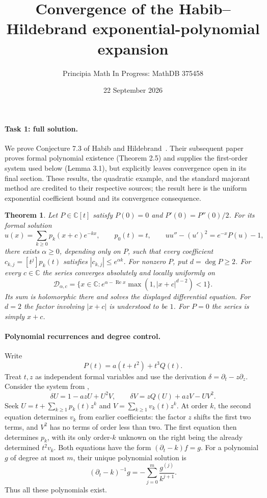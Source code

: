 \documentclass[11pt]{article}
\title{Convergence of the Habib--Hildebrand exponential-polynomial expansion}
\author{Principia Math In Progress: MathDB 375458}
\date{22 September 2026}
\newtheorem{theorem}{Theorem}
\newcommand{\C}{\mathbb C}
\begin{document}
\maketitle

\paragraph{Task 1: full solution.}
We prove Conjecture 7.3 of Habib and Hildebrand~\cite{necessary}.
Their subsequent paper~\cite{sufficient} proves formal polynomial existence
(Theorem 2.5) and supplies the first-order system used below (Lemma 3.1),
but explicitly leaves convergence open in its final section.
These results, the quadratic example, and the standard majorant method
are credited to their respective sources; the result here is the uniform
exponential coefficient bound and its convergence consequence.

\begin{theorem}
Let $P\in\C[t]$ satisfy $P(0)=0$ and $P'(0)=P''(0)/2$.
For its formal solution
\[
 u(x)=\sum_{k\geq0}p_k(x+c)e^{-kx},\qquad p_0(t)=t,
 \qquad uu''-(u')^2=e^{-x}P(u)-1,
\]
there exists $\alpha\geq0$, depending only on $P$, such that every
coefficient $c_{k,j}=[t^j]p_k(t)$ satisfies
$|c_{k,j}|\leq e^{\alpha k}$.
For nonzero $P$, put $d=\deg P\geq2$. For every $c\in\C$ the series
converges absolutely and locally uniformly on
\[
 \mathcal D_{\alpha,c}=
 \{x\in\C:e^{\alpha-\operatorname{Re}x}
                  \max(1,|x+c|^{d-2})<1\}.
\]
Its sum is holomorphic there and solves the displayed differential equation.
For $d=2$ the factor involving $|x+c|$ is understood to be $1$.
For $P=0$ the series is simply $x+c$.
\end{theorem}

\paragraph{Polynomial recurrences and degree control.}
Write
\[
 P(t)=a(t+t^2)+t^3Q(t).
\]
Treat $t,z$ as independent formal variables and use the derivation
$\delta=\partial_t-z\partial_z$. Consider the system from
\cite[Lemma 3.1]{sufficient},
\begin{equation}\label{system}
 \delta U=1-azU+U^2V,\qquad
 \delta V=zQ(U)+azV-UV^2.
\end{equation}
Seek $U=t+\sum_{k\geq1}p_k(t)z^k$ and
$V=\sum_{k\geq1}v_k(t)z^k$.
At order $k$, the second equation determines $v_k$ from earlier
coefficients: the factor $z$ shifts the first two terms, and $V^2$ has
no terms of order less than two.
The first equation then determines $p_k$, with its only order-$k$
unknown on the right being the already determined $t^2v_k$.
Both equations have the form $(\partial_t-k)f=g$.
For a polynomial $g$ of degree at most $m$, their unique polynomial solution is
\begin{equation}\label{inverse}
 (\partial_t-k)^{-1}g
 =-\sum_{j=0}^{m}\frac{g^{(j)}}{k^{j+1}}.
\end{equation}
Thus all these polynomials exist.
\end{document}
